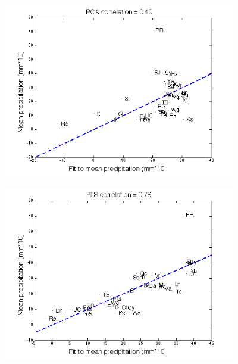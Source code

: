 \documentclass[11pt]{beamer}
\begin{document}
\begin{frame}

\begin{center}
\includegraphics[width=4in]{figs/Daily_PCA_Fit.png}
\end{center}

\end{frame}


\begin{frame}

\begin{center}
\includegraphics[width=4in]{figs/Daily_PLS_Fit.png}
\end{center}

\end{frame}

\end{document}
